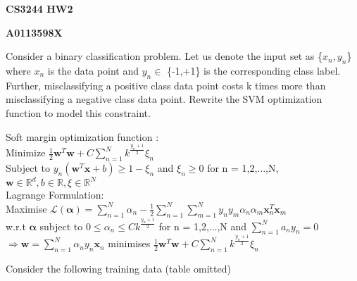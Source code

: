 \documentclass[11pt,a4paper,answers]{exam}
\providecommand{\nline}{\vspace*{.5cm}}
\begin{document}
\begin{center}
{\bf CS3244 HW2}

{\bf A0113598X}
\end{center}

\nline

\begin{questions}
	\question
	Consider a binary classification problem. Let us denote the input set as \{$x_{n}, y_{n}$\} where $x_{n}$ is the data point and $y_{n} \in$ \{-1,+1\} is the corresponding class label. Further, misclassifying a positive class data point costs k times more than misclassifying a negative class data point. Rewrite the SVM optimization function to model this constraint.
	\begin{solution}
		Soft margin optimization function :\\
		Minimize $\frac{1}{2}\mathbf{w}^{T}\mathbf{w} + C \sum_{n=1}^{N}k^{\frac{y_{n} + 1}{2}}\xi _{n}$ \\
		Subject to $y_{n}(\mathbf{w}^{T}\mathbf{x} + b) \geq 1 - \xi_{n}$ and $\xi_{n} \geq 0$ for n = 1,2,...,N,
		$\mathbf{w} \in \mathbb{R}^{d}, b \in \mathbb{R}, \xi \in \mathbb{R}^{N}$ \\
		Lagrange Formulation:\\
		Maximise $ \mathcal{L}(\mathbf{\alpha}) = \sum_{n=1}^{N}\alpha_{n} - \frac{1}{2}\sum_{n=1}^{N}\sum_{m=1}^{N}y_{n}y_{m}\alpha_{n}\alpha_{m}\mathbf{x}_{n}^{T}\mathbf{x}_{m}$\\
		w.r.t $\mathbf{\alpha} $
		subject to $0 \leq \alpha_{n} \leq C k^{\frac{y_{n} + 1}{2}}$ for n = 1,2,...,N and $\sum_{n=1}^{N}a_{n}y_{n} = 0$ \\
		$\Rightarrow \mathbf{w} =\sum_{n=1}^{N}\alpha_{n}y_{n}\mathbf{x}_{n} $ minimises $\frac{1}{2}\mathbf{w}^{T}\mathbf{w} + C \sum_{n=1}^{N}k^{\frac{y_{n} + 1}{2}}\xi _{n}$
	\end{solution}

	\question
	Consider the following training data (table omitted)
\end{questions}
\end{document}
